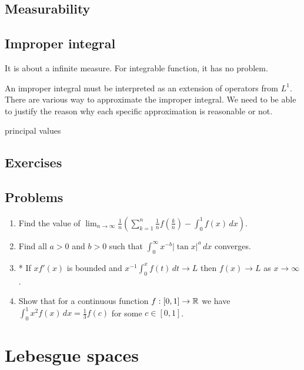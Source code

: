 \documentclass{../../large}
\begin{document}
\section{Measurability}

\begin{prb}
\end{prb}

\begin{prb}
\end{prb}



\begin{prb}
\end{prb}


\section{Improper integral}
It is about a infinite measure.
For integrable function, it has no problem.

An improper integral must be interpreted as an extension of operators from $L^1$.
There are various way to approximate the improper integral.
We need to be able to justify the reason why each specific approximation is reasonable or not.

principal values


\section*{Exercises}

\section*{Problems}
\begin{enumerate}
\item Find the value of $\lim_{n\to\infty}\frac1n\left(\sum_{k=1}^n\frac1nf\left(\frac kn\right)-\int_0^1f(x)\,dx\right)$.
\item Find all $a>0$ and $b>0$ such that $\int_0^\infty x^{-b}|\tan x|^a\,dx$ converges.
\item* If $xf'(x)$ is bounded and $x^{-1}\int_0^xf(t)\,dt\to L$ then $f(x)\to L$ as $x\to\infty$.
\item Show that for a continuous function $f:[0,1]\to\mathbb{R}$ we have $\int_0^1x^2f(x)\,dx=\frac13f(c)$ for some $c\in[0,1]$.
\end{enumerate}


\chapter{Lebesgue spaces}
\end{document}
